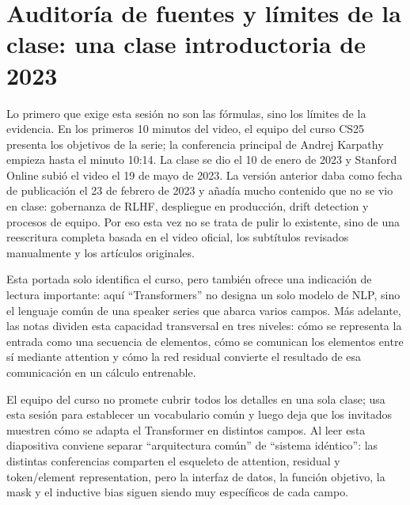 \section{Auditoría de fuentes y límites de la clase: una clase introductoria de 2023}

Lo primero que exige esta sesión no son las fórmulas, sino los límites de la evidencia. En los primeros 10 minutos del video, el equipo del curso CS25 presenta los objetivos de la serie; la conferencia principal de Andrej Karpathy empieza hasta el minuto 10:14. La clase se dio el 10 de enero de 2023 y Stanford Online subió el video el 19 de mayo de 2023. La versión anterior daba como fecha de publicación el 23 de febrero de 2023 y añadía mucho contenido que no se vio en clase: gobernanza de RLHF, despliegue en producción, drift detection y procesos de equipo. Por eso esta vez no se trata de pulir lo existente, sino de una reescritura completa basada en el video oficial, los subtítulos revisados manualmente y los artículos originales.


Esta portada solo identifica el curso, pero también ofrece una indicación de lectura importante: aquí ``Transformers'' no designa un solo modelo de NLP, sino el lenguaje común de una speaker series que abarca varios campos. Más adelante, las notas dividen esta capacidad transversal en tres niveles: cómo se representa la entrada como una secuencia de elementos, cómo se comunican los elementos entre sí mediante attention y cómo la red residual convierte el resultado de esa comunicación en un cálculo entrenable.


El equipo del curso no promete cubrir todos los detalles en una sola clase; usa esta sesión para establecer un vocabulario común y luego deja que los invitados muestren cómo se adapta el Transformer en distintos campos. Al leer esta diapositiva conviene separar ``arquitectura común'' de ``sistema idéntico'': las distintas conferencias comparten el esqueleto de attention, residual y token/element representation, pero la interfaz de datos, la función objetivo, la mask y el inductive bias siguen siendo muy específicos de cada campo.

